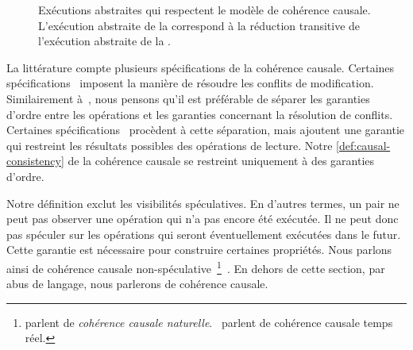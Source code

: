 \begin{figure}[tbh]
\begin{subfigure}{\linewidth}
    \caption{}\label{fig:vis-vs-pre-2}
\end{subfigure}
\caption[Exécutions abstraites qui respectent le modèle de cohérence causale]{Exécutions abstraites qui respectent le modèle de cohérence causale.
L'exécution abstraite de la  correspond à la réduction transitive de l'exécution abstraite de la .}\label{fig:vis-vs-pre}
\end{figure}

La littérature compte plusieurs spécifications de la cohérence causale.
Certaines spécifications~\autocite{ahamad_1995_causal} imposent la manière de résoudre les conflits de modification.
Similairement à~\textcite{mahajan_2011_cac}, nous pensons qu'il est préférable de séparer les garanties d'ordre entre les opérations et les garanties concernant la résolution de conflits.
Certaines spécifications~\autocite{burckhardt_eventualconsistency_2014,viotti_consistency_2016} procèdent à cette séparation, mais ajoutent une garantie qui restreint les résultats possibles des opérations de lecture.
Notre \autoref{def:causal-consistency} de la cohérence causale se restreint uniquement à des garanties d'ordre.

Notre définition exclut les visibilités spéculatives.
En d'autres termes, un pair ne peut pas observer une opération qui n'a pas encore été exécutée.
Il ne peut donc pas spéculer sur les opérations qui seront éventuellement exécutées dans le futur.
Cette garantie est nécessaire pour construire certaines propriétés.
Nous parlons ainsi de cohérence causale non-spéculative~\footnote{\textcite{mahajan_2011_cac} parlent de \emph{cohérence causale naturelle}.~\textcite{viotti_consistency_2016} parlent de cohérence causale temps réel.}~\autocite{mahajan_2011_cac,viotti_consistency_2016}.
En dehors de cette section, par abus de langage, nous parlerons de cohérence causale.

